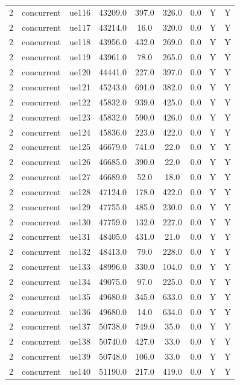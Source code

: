 \begin{table}[ht]
\begin{tabular}{|c|c|c|c|c|c|c|c|c|}
2 & concurrent & ue116 & 43209.0 & 397.0 & 326.0 & 0.0 & Y & Y \\
2 & concurrent & ue117 & 43214.0 & 16.0 & 320.0 & 0.0 & Y & Y \\
2 & concurrent & ue118 & 43956.0 & 432.0 & 269.0 & 0.0 & Y & Y \\
2 & concurrent & ue119 & 43961.0 & 78.0 & 265.0 & 0.0 & Y & Y \\
2 & concurrent & ue120 & 44441.0 & 227.0 & 397.0 & 0.0 & Y & Y \\
2 & concurrent & ue121 & 45243.0 & 691.0 & 382.0 & 0.0 & Y & Y \\
2 & concurrent & ue122 & 45832.0 & 939.0 & 425.0 & 0.0 & Y & Y \\
2 & concurrent & ue123 & 45832.0 & 590.0 & 426.0 & 0.0 & Y & Y \\
2 & concurrent & ue124 & 45836.0 & 223.0 & 422.0 & 0.0 & Y & Y \\
2 & concurrent & ue125 & 46679.0 & 741.0 & 22.0 & 0.0 & Y & Y \\
2 & concurrent & ue126 & 46685.0 & 390.0 & 22.0 & 0.0 & Y & Y \\
2 & concurrent & ue127 & 46689.0 & 52.0 & 18.0 & 0.0 & Y & Y \\
2 & concurrent & ue128 & 47124.0 & 178.0 & 422.0 & 0.0 & Y & Y \\
2 & concurrent & ue129 & 47755.0 & 485.0 & 230.0 & 0.0 & Y & Y \\
2 & concurrent & ue130 & 47759.0 & 132.0 & 227.0 & 0.0 & Y & Y \\
2 & concurrent & ue131 & 48405.0 & 431.0 & 21.0 & 0.0 & Y & Y \\
2 & concurrent & ue132 & 48413.0 & 79.0 & 228.0 & 0.0 & Y & Y \\
2 & concurrent & ue133 & 48996.0 & 330.0 & 104.0 & 0.0 & Y & Y \\
2 & concurrent & ue134 & 49075.0 & 97.0 & 225.0 & 0.0 & Y & Y \\
2 & concurrent & ue135 & 49680.0 & 345.0 & 633.0 & 0.0 & Y & Y \\
2 & concurrent & ue136 & 49680.0 & 14.0 & 634.0 & 0.0 & Y & Y \\
2 & concurrent & ue137 & 50738.0 & 749.0 & 35.0 & 0.0 & Y & Y \\
2 & concurrent & ue138 & 50740.0 & 427.0 & 33.0 & 0.0 & Y & Y \\
2 & concurrent & ue139 & 50748.0 & 106.0 & 33.0 & 0.0 & Y & Y \\
2 & concurrent & ue140 & 51190.0 & 217.0 & 419.0 & 0.0 & Y & Y \\

\end{tabular}
\end{table}
